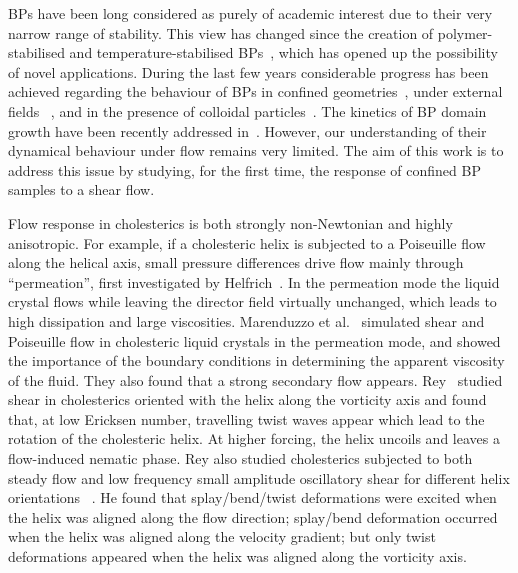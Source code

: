\documentclass[aps,pre,reprint,superscriptaddress, twocolumn]{revtex4}
\begin{document}
BPs have been long considered as purely of academic interest due to their very narrow 
range of stability. This view has changed since the creation of polymer-stabilised and 
temperature-stabilised BPs~\cite{Kikuchi:2002,Coles:2005}, which has opened up the 
possibility of novel applications.
During the last few years considerable progress has been achieved regarding the behaviour 
of BPs in confined geometries~\cite{Fukuda:2010a, Fukuda:2010b, Ravnik:2011b}, under 
external fields ~\cite{Alexander:2008,Fukuda:2009,Henrich:2010a,Castles:2010,Tiribocchi:2011a}, 
and in the presence of colloidal particles~\cite{Ravnik:2011a}.
The kinetics of BP domain growth have been recently addressed in~\cite{Henrich:2010b}. 
However, our understanding of their dynamical behaviour under flow remains
very limited. The aim of this work is to address this issue by studying,
for the first time, the response of confined BP samples to a shear flow.

Flow response in cholesterics is both strongly non-Newtonian and highly anisotropic.
For example, if a cholesteric helix is subjected to a Poiseuille flow along
the helical axis, small pressure differences drive flow mainly through
``permeation'', first investigated by Helfrich~\cite{Helfrich:1969}.
In the permeation mode the liquid crystal flows while leaving the director
field virtually unchanged, which leads to high dissipation and large
viscosities. Marenduzzo et al.~\cite{Marenduzzo:2006a,Marenduzzo:2006b} simulated 
shear and Poiseuille flow in cholesteric liquid crystals in the permeation mode, and 
showed the importance of the boundary conditions in determining the apparent viscosity of the fluid. 
They also found that a strong secondary flow appears.
Rey~\cite{Rey:1996a, Rey:1996b} studied shear in cholesterics oriented with the helix along 
the vorticity axis and found that, at low Ericksen number, travelling twist waves appear which 
lead to the rotation of the cholesteric helix. At higher forcing, the helix uncoils and 
leaves a flow-induced nematic phase.
Rey also studied cholesterics subjected to both steady flow and low frequency
small amplitude oscillatory shear for different helix orientations
~\cite{Rey:2000, Rey:2002}. He found that splay/bend/twist deformations were
excited when the helix was aligned along the flow direction; splay/bend
deformation occurred when the helix was aligned along the velocity gradient;
but only twist deformations
appeared when the helix was aligned along the vorticity axis.
\end{document}
